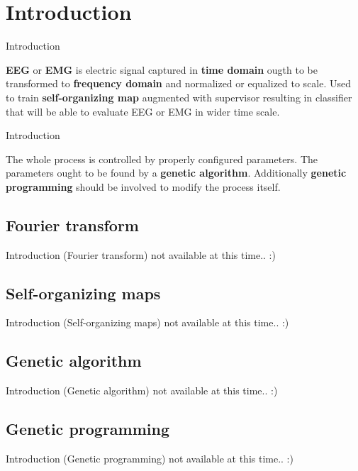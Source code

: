 \documentclass{beamer}
\begin{document}
\section{Introduction}

\begin{frame}{Introduction}
\begin{center}
\textbf{EEG} or \textbf{EMG} is electric signal captured in \textbf{time domain} 
ougth to be transformed to \textbf{frequency domain}  and
normalized or equalized to scale.
Used to train \textbf{self-organizing map}
augmented with supervisor 
resulting in classifier that will be able to evaluate EEG or EMG in wider time scale.
\end{center}
\end{frame}

\begin{frame}{Introduction}
\begin{center}
The whole process is controlled by properly configured parameters. The parameters ought to be
found by a \textbf{genetic algorithm}. Additionally \textbf{genetic programming} 
should be involved to modify the process itself.
\end{center}
\end{frame}

\subsection{Fourier transform}
\begin{frame}{Introduction (Fourier transform)}
\alert{not available at this time.. :)}
\end{frame}

\subsection{Self-organizing maps}
\begin{frame}{Introduction (Self-organizing maps)}
\alert{not available at this time.. :)}
\end{frame}

\subsection{Genetic algorithm}
\begin{frame}{Introduction (Genetic algorithm)}
\alert{not available at this time.. :)}
\end{frame}

\subsection{Genetic programming}
\begin{frame}{Introduction (Genetic programming)}
\alert{not available at this time.. :)}
\end{frame}
\end{document}
